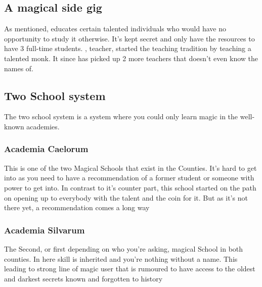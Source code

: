     \subsection*{A magical side gig}
    As mentioned, \Cloister{} educates certain talented individuals who would have no opportunity to study it otherwise. It's kept secret and only have the resources to have 3 full-time students. \MasterFullName{}, \Name{} teacher, started the teaching tradition by teaching a talented monk. It since has picked up 2 more teachers that \Name{} doesn't even know the names of.

    \subsection*{Two School system}
    The two school system is a system where you could only learn magic in the well-known academies.

    \subsubsection*{Academia Caelorum}
    This is one of the two Magical Schools that exist in the Counties.  It's hard to get into as you need to have a recommendation of a former student or someone with power to get into.
    In contrast to it's counter part, this school started on the path on opening up to everybody with the talent and the coin for it.  But as it's not there yet, a recommendation comes a long way

    \subsubsection*{Academia Silvarum}
    The Second, or first depending on who you're asking, magical School in both counties. In here skill is inherited and you're nothing without a name. This leading to strong line of magic user that is rumoured to have access to the oldest and darkest secrets known and forgotten to history

\fi